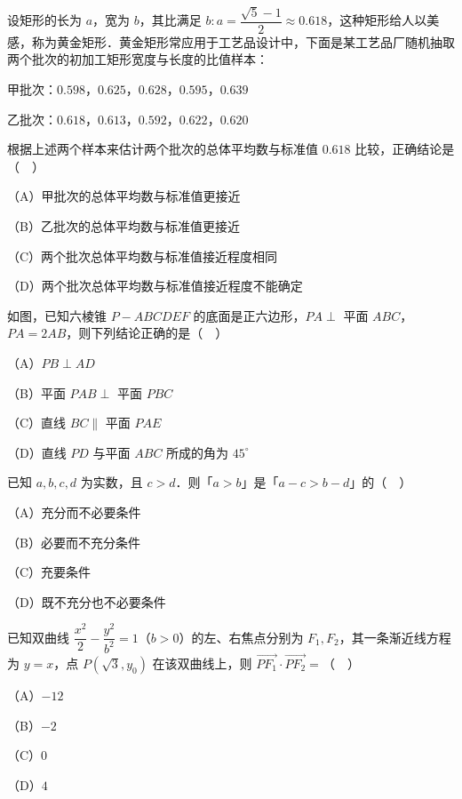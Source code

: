 \begin{question}
设矩形的长为 $a$，宽为 $b$，其比满足 $b:a=\dfrac{\sqrt5-1}{2}\approx0.618$，这种矩形给人以美感，称为黄金矩形．黄金矩形常应用于工艺品设计中，下面是某工艺品厂随机抽取两个批次的初加工矩形宽度与长度的比值样本：

甲批次：$0.598$，$0.625$，$0.628$，$0.595$，$0.639$

乙批次：$0.618$，$0.613$，$0.592$，$0.622$，$0.620$

根据上述两个样本来估计两个批次的总体平均数与标准值 $0.618$ 比较，正确结论是（　）

（A）甲批次的总体平均数与标准值更接近

（B）乙批次的总体平均数与标准值更接近

（C）两个批次总体平均数与标准值接近程度相同

（D）两个批次总体平均数与标准值接近程度不能确定

\Needspace{0.4\textheight}
\end{question}
\begin{question}
如图，已知六棱锥 $P-ABCDEF$ 的底面是正六边形，$PA\perp$ 平面 $ABC$，$PA=2AB$，则下列结论正确的是（　）
\nopagebreak[4]
\begin{center}\end{center}
\nopagebreak[4]
（A）$PB\perp AD$

（B）平面 $PAB\perp$ 平面 $PBC$

（C）直线 $BC\parallel$ 平面 $PAE$

（D）直线 $PD$ 与平面 $ABC$ 所成的角为 $45^\circ$

\end{question}
\begin{question}
已知 $a,b,c,d$ 为实数，且 $c>d$．则「$a>b$」是「$a-c>b-d$」的（　）

（A）充分而不必要条件

（B）必要而不充分条件

（C）充要条件

（D）既不充分也不必要条件

\end{question}
\begin{question}
已知双曲线 $\dfrac{x^2}{2}-\dfrac{y^2}{b^2}=1$（$b>0$）的左、右焦点分别为 $F_1,F_2$，其一条渐近线方程为 $y=x$，点 $P(\sqrt3,y_0)$ 在该双曲线上，则 $\overrightarrow{PF_1}\cdot\overrightarrow{PF_2}=$（　）

（A）$-12$

（B）$-2$

（C）$0$

（D）$4$

\Needspace{0.4\textheight}
\end{question}
